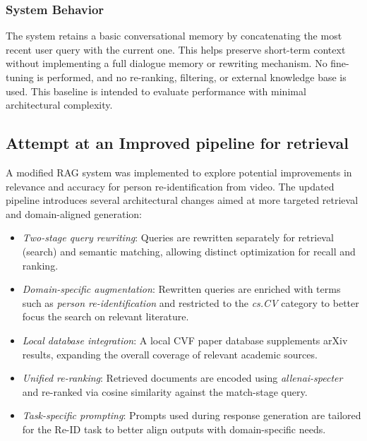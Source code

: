 \documentclass[fleqn,moreauthors,10pt]{ds_report}
\begin{document}
\subsubsection*{System Behavior}
The system retains a basic conversational memory by concatenating the most recent user query with the current one. This helps preserve short-term context without implementing a full dialogue memory or rewriting mechanism. No fine-tuning is performed, and no re-ranking, filtering, or external knowledge base is used. This baseline is intended to evaluate performance with minimal architectural complexity.


\subsection*{Attempt at an Improved pipeline for retrieval}

A modified RAG system was implemented to explore potential improvements in relevance and accuracy for person re-identification from video. The updated pipeline introduces several architectural changes aimed at more targeted retrieval and domain-aligned generation:

\begin{itemize}
    \item \textit{Two-stage query rewriting}: Queries are rewritten separately for retrieval (search) and semantic matching, allowing distinct optimization for recall and ranking.

    \item \textit{Domain-specific augmentation}: Rewritten queries are enriched with terms such as \textit{person re-identification} and restricted to the \textit{cs.CV} category to better focus the search on relevant literature.

    \item \textit{Local database integration}: A local CVF paper database supplements arXiv results, expanding the overall coverage of relevant academic sources.

    \item \textit{Unified re-ranking}: Retrieved documents are encoded using \textit{allenai-specter} and re-ranked via cosine similarity against the match-stage query.

    \item \textit{Task-specific prompting}: Prompts used during response generation are tailored for the Re-ID task to better align outputs with domain-specific needs.
\end{itemize}
\end{document}
